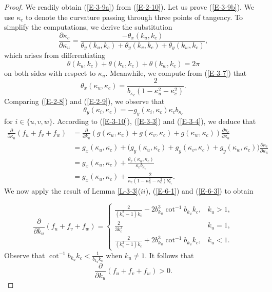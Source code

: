 \documentclass[11pt,leqno]{article}
\numberwithin{equation}{section}
\theoremstyle{definition}
\begin{document}
\begin{proof}
We readily obtain (\ref{E-3-9a}) from (\ref{E-2-10}). Let us prove (\ref{E-3-9b}).
We use $\kappa_c$ to denote the curvature passing through three points of tangency.
To simplify the computations, we derive the substitution
\begin{equation}\label{E-3-10}
\frac{\partial \kappa_c}{\partial \kappa_u}=\frac{-\theta_x(k_u,k_c)}{\theta_y(k_u,k_c)+\theta_y(k_v,k_c)+\theta_y(k_w,k_c)},
\end{equation}
which arises from differentiating
 \[\theta(k_u,k_c)+\theta(k_v,k_c)+\theta(k_w,k_c)=2\pi\]
on both sides with respect to $\kappa_u$. Meanwhile, we compute from (\ref{E-3-7}) that
\begin{equation}\label{E-3-3}\theta_x(\kappa_u,\kappa_c)=\frac{2}{b_{\kappa_c}(1-\kappa_u^2-\kappa_c^2)}.\end{equation}
Comparing (\ref{E-2-8}) and (\ref{E-2-9}), we observe that
\begin{equation}\label{E-3-4}\theta_y(\kappa_i,\kappa_c)=-g_y(\kappa_i,\kappa_c)\kappa_cb_{\kappa_c}\end{equation}
for $i\in\{u,v,w\}$. According to (\ref{E-3-10}), (\ref{E-3-3}) and (\ref{E-3-4}), we deduce that
 \[\begin{aligned}
 \frac{\partial}{\partial \kappa_u}(f_u+f_v+f_w)&=\frac{\partial}{\partial k_u}(g(\kappa_u,\kappa_c)+g(\kappa_v,\kappa_c)+g(\kappa_w,\kappa_c))\frac{\partial \kappa_c}{\partial \kappa_u}\\
 &=g_x(\kappa_u,\kappa_c)+\big(g_y(\kappa_u,\kappa_c)+g_y(\kappa_v,\kappa_c)+g_y(\kappa_w,\kappa_c)\big)\frac{\partial \kappa_c}{\partial \kappa_u}\\
 &=g_x(\kappa_u,\kappa_c)+\frac{\theta_x(\kappa_u,\kappa_c)}{\kappa_cb_{\kappa_c}}\\
&=g_x(\kappa_u,\kappa_c)+\frac{2}{\kappa_c(1 - \kappa_u^2 - \kappa_c^2)b^2_{\kappa_c}}.
 \end{aligned}\]
We now apply the result of  Lemma \ref{L-3-3}($ii$), (\ref{E-6-1}) and (\ref{E-6-3}) to obtain



  \[
\frac{\partial}{\partial k_u}(f_u+f_v+f_w)
=
\begin{cases}
\frac{2}{(k_u^2-1)k_c}-2b^3_{k_u}\cot^{-1}b_{k_u}k_c,
& k_u>1,\\
\frac{2}{3k_c^3}
& k_u=1,\\
\frac{2}{(k_u^2-1)k_c}+2b^3_{k_u}\cot^{-1}b_{k_u}k_c,
& k_u<1.
\end{cases}
\]
Observe that $\cot^{-1}b_{k_u}k_c<\frac{1}{b_{k_u}k_c}$ when $k_u\neq 1$. It follows that
\[\frac{\partial}{\partial k_u}(f_u+f_v+f_w)>0.\]
\end{proof}
\end{document}
